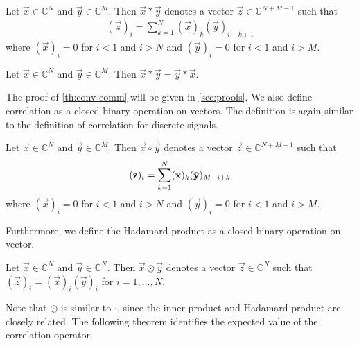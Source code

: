 \documentclass[a4paper, openany, oneside]{memoir}
\begin{document}
\begin{blockDefinition}[Convolution]
    Let $\vec{x} \in \mathbb{C}^N$ and $\vec{y} \in \mathbb{C}^M$. Then $\vec{x} \ast \vec{y}$ denotes a vector $\vec{z} \in \mathbb{C}^{N+M-1}$ such that
    \begin{align*}
        (\vec{z})_i = \sum_{k=1}^{N} (\vec{x})_k (\vec{y})_{i-k+1}
    \end{align*}
    where $(\vec{x})_i=0$ for $i < 1$ and $i > N$ and $(\vec{y})_i=0$ for $i < 1$ and $i > M$.
\end{blockDefinition}

\begin{blockTheorem} \label{th:conv-comm}
    Let $\vec{x} \in \mathbb{C}^N$ and $\vec{y} \in \mathbb{C}^M$. Then $\vec{x} \ast \vec{y} = \vec{y} \ast \vec{x}$.
\end{blockTheorem}

The proof of \cref{th:conv-comm} will be given in \cref{sec:proofs}. We also define correlation as a closed binary operation on vectors. The definition is again similar to the definition of correlation for discrete signals.

\begin{blockDefinition}
    Let $\vec{x} \in \mathbb{C}^N$ and $\vec{y} \in \mathbb{C}^M$. Then $\vec{x} \circ \vec{y}$ denotes a vector $\vec{z} \in \mathbb{C}^{N+M-1}$ such that
    \begin{align*}
        (\boldsymbol{\mathbf{z}})_i = \sum_{k=1}^{N} (\boldsymbol{\mathbf{x}})_k (\bar{\boldsymbol{\mathbf{y}}})_{M-i+k}
    \end{align*}
    where $(\vec{x})_i=0$ for $i < 1$ and $i > N$ and $(\vec{y})_i=0$ for $i < 1$ and $i > M$.
\end{blockDefinition}

Furthermore, we define the Hadamard product as a closed binary operation on vector.

\begin{blockDefinition}
    Let $\vec{x} \in \mathbb{C}^N$ and $\vec{y} \in \mathbb{C}^N$. Then $\vec{x} \odot \vec{y}$ denotes a vector $\vec{z} \in \mathbb{C}^N$ such that $(\vec{z})_i = (\vec{x})_i (\vec{y})_i$ for $i = 1,\ldots,N$.
\end{blockDefinition}

Note that $\odot$ is similar to $\cdot$, since the inner product and Hadamard product are closely related.
The following theorem identifies the expected value of the correlation operator.
\end{document}
